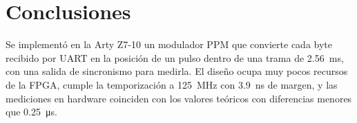 \documentclass[11pt,a4paper]{article}
\begin{document}
\section{Conclusiones}

Se implementó en la Arty Z7-10 un modulador PPM que convierte cada byte recibido por UART en la posición de un
pulso dentro de una trama de \SI{2,56}{\milli\second}, con una salida de sincronismo para medirla. El diseño
ocupa muy pocos recursos de la FPGA, cumple la temporización a \SI{125}{\mega\hertz} con
\SI{3,9}{\nano\second} de margen, y las mediciones en hardware coinciden con los valores teóricos con diferencias menores que \SI{0,25}{\micro\second}.
\end{document}
